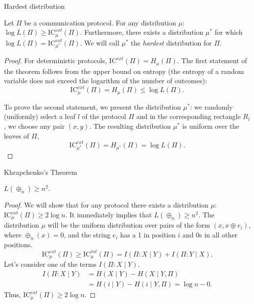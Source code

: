 \documentclass[aspectratio=169]{beamer}
\newcommand{\IC}{\mathrm{IC}}
\begin{document}
\begin{frame}{Hardest distribution}
\begin{theorem}
    Let $\Pi$ be a communication protocol. For any distribution $\mu$:
    \(
    \log L(\Pi) \ge \IC_\mu^{ext}(\Pi).
    \)
    Furthermore, there exists a distribution $\mu^*$ for which
    \(
    \log L(\Pi) = \IC_{\mu^*}^{ext}(\Pi).
    \)
    We will call $\mu^*$ the \emph{hardest} distribution for $\Pi$.
\end{theorem}\pause
\begin{proof} For deterministic protocols, $\IC^{ext}(\Pi) = H_\mu(\Pi)$.
    The first statement of the theorem follows from the upper bound on entropy (the entropy
    of a random variable does not exceed the logarithm of the number of outcomes):
    \[
    \IC_\mu^{ext}(\Pi) = H_\mu(\Pi) \le \log L(\Pi).
    \]

    \pause
    To prove the second statement, we present the distribution $\mu^*$:
    we randomly (uniformly) select a leaf $l$ of the protocol $\Pi$ and in the corresponding rectangle $R_l$, we choose any pair $(x,y)$. The resulting distribution $\mu^*$ is uniform over the leaves of $\Pi$,
    \[
    \IC_{\mu^*}^{ext}(\Pi) = H_{\mu^*}(\Pi) = \log L(\Pi).
    \]
\end{proof}
\end{frame}

\begin{frame}{Khrapchenko's Theorem}
\begin{theorem}[Khrapchenko]
    $L(\oplus_n) \ge n^2$.
\end{theorem}
\begin{proof}
    We will show that for any protocol there exists a distribution $\mu$: $\IC^{ext}_\mu(\Pi) \ge 2\log n$.
    \pause
    It immediately implies that $L(\oplus_n) \ge n^2$.
    The distribution $\mu$ will be the uniform distribution over pairs of the form $(x,x \oplus e_i)$,
    where $\oplus_n(x) = 0$, and the string $e_i$ has a 1 in position $i$ and 0s in all other positions.
    \pause
    \[
    \IC_\mu^{ext}(\Pi)
    \ge \IC_\mu^{int}(\Pi)
    = I(\Pi:X \mid Y) + I(\Pi:Y \mid X).
    \]
    \pause Let's consider one of the terms $I(\Pi:X \mid Y)$.
    \[\begin{aligned}
        I(\Pi:X \mid Y) &= H(X \mid Y) - H(X \mid Y,\Pi)\\
        &= H(i \mid Y) - H(i \mid Y,\Pi) = \log n - 0.
    \end{aligned}\]
    \pause Thus, $\IC_\mu^{ext}(\Pi) \ge 2\log n$.
    \end{proof}
\end{frame}
\end{document}
